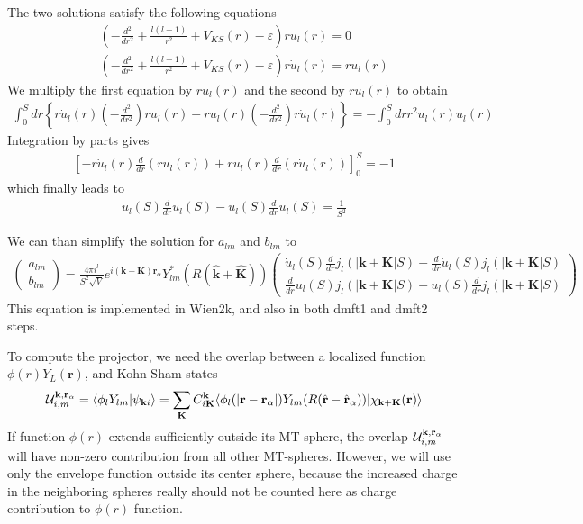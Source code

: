 \documentclass[aps,prb,floatfix,epsfig,twocolumn,showpacs,preprintnumbers]{revtex4}
\renewcommand{\vr}{{\mathbf{r}}}
\newcommand{\vk}{{\mathbf{k}}}
\newcommand{\vK}{{\mathbf{K}}}
\newcommand{\cU}{{\cal U}}
\begin{document}
\begin{widetext}
The two solutions satisfy the following equations
\begin{eqnarray}
&&\left(-\frac{d^2}{dr^2}+\frac{l(l+1)}{r^2}+V_{KS}(r)-\varepsilon \right) r u_l(r)=0\\
&&\left(-\frac{d^2}{dr^2}+\frac{l(l+1)}{r^2}+V_{KS}(r)-\varepsilon \right)r \dot{u}_l(r)= r u_l(r)
\end{eqnarray}
We multiply the first equation by $r\dot{u}_l(r)$ and the second by $ru_l(r)$ to obtain
\begin{eqnarray}
\int_0^S dr\left\{ r\dot{u}_l(r) \left(-\frac{d^2}{dr^2}\right) r u_l(r)
-r u_l(r)
\left(-\frac{d^2}{dr^2}\right)r \dot{u}_l(r)\right\}=-\int_0^S dr r^2 u_l(r)u_l(r)
\end{eqnarray}
Integration by parts gives
\begin{eqnarray}
\left[
- r\dot{u}_l(r) \frac{d}{dr} \left(r u_l(r)\right)
+r u_l(r) \frac{d}{dr} \left(r \dot{u}_l(r)\right)\right]_0^S
=-1
\end{eqnarray}
which finally leads to
\begin{eqnarray}
\dot{u}_l(S) \frac{d}{dr} u_l(S)
-u_l(S) \frac{d}{dr} \dot{u}_l(S) =\frac{1}{S^2}
\end{eqnarray}

We can than simplify the solution for $a_{lm}$ and $b_{lm}$ to 
\begin{eqnarray}
\left(
\begin{array}{c}
a_{lm}\\
b_{lm}
\end{array}
\right)=
\frac{4\pi i^l}{S^2 \sqrt{V}}e^{i(\vk+\vK)\vr_\alpha}Y_{lm}^*(R(\hat{\vk}+\hat{\vK}))
%
\left(
\begin{array}{c}
\dot{u}_l(S)\frac{d}{dr} j_l(|\vk+\vK|S)-\frac{d}{dr} \dot{u}_l(S) j_l(|\vk+\vK|S)\\
\frac{d}{dr} u_l(S) j_l(|\vk+\vK|S)- u_l(S) \frac{d}{dr} j_l(|\vk+\vK|S)
\end{array}
\right)
\end{eqnarray}
This equation is implemented in Wien2k, and also in both dmft1 and
dmft2 steps.


To compute the projector, we need the overlap between a localized function
$\phi(r) Y_L(\vr)$, and Kohn-Sham states
\begin{eqnarray}
\cU^{\vk,\vr_\alpha}_{i,m}=\langle \phi_l Y_{lm}|\psi_{\vk i}\rangle  =
\sum_\vK C^\vk_{i\vK} \langle \phi_l(|\vr-\vr_\alpha|) Y_{lm}(R(\hat{\vr}-\hat{\vr}_\alpha))|\chi_{\vk+\vK}(\vr)\rangle
\end{eqnarray}
If function $\phi(r)$ extends sufficiently outside its MT-sphere, the
overlap $\cU^{\vk,\vr_\alpha}_{i,m}$ will have non-zero contribution
from all other MT-spheres. However, we will use only the envelope
function outside its center sphere, because the increased charge in
the neighboring spheres really should not be counted here as charge
contribution to $\phi(r)$ function.


\end{widetext}
\end{document}
